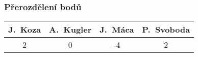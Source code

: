 \documentclass{beamer}
\begin{document}
\begin{frame}[allowframebreaks]\frametitle{Přerozdělení bodů}
    
    \begin{center}
  \begin{tabular}{| c | c | c | c |}
    \hline
     J.~Koza & A.~Kugler & J.~Máca & P.~Svoboda \\
    \hline
     2 & 0 & -4 & 2 \\
    \hline
  \end{tabular}     
   \end{center}
\end{frame}
\end{document}
